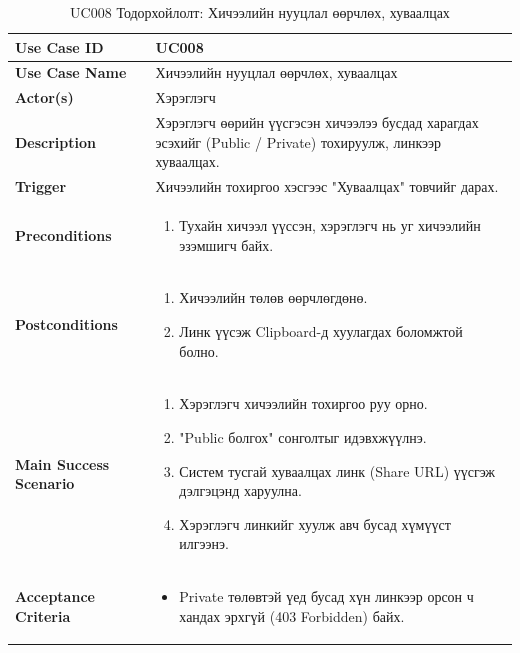 \begin{longtable}{|p{4cm}|p{11cm}|}
\caption{UC008 Тодорхойлолт: Хичээлийн нууцлал өөрчлөх, хуваалцах} \\
\hline
\textbf{Use Case ID} & UC008 \\ \hline
\textbf{Use Case Name} & Хичээлийн нууцлал өөрчлөх, хуваалцах \\ \hline
\textbf{Actor(s)} & Хэрэглэгч \\ \hline
\textbf{Description} & Хэрэглэгч өөрийн үүсгэсэн хичээлээ бусдад харагдах эсэхийг (Public / Private) тохируулж, линкээр хуваалцах. \\ \hline
\textbf{Trigger} & Хичээлийн тохиргоо хэсгээс "Хуваалцах" товчийг дарах. \\ \hline
\textbf{Preconditions} & 
\begin{enumerate}
    \item Тухайн хичээл үүссэн, хэрэглэгч нь уг хичээлийн эзэмшигч байх.
\end{enumerate} \\ \hline
\textbf{Postconditions} & 
\begin{enumerate}
    \item Хичээлийн төлөв өөрчлөгдөнө.
    \item Линк үүсэж Clipboard-д хуулагдах боломжтой болно.
\end{enumerate} \\ \hline
\textbf{Main Success Scenario} & 
\begin{enumerate}
    \item Хэрэглэгч хичээлийн тохиргоо руу орно.
    \item "Public болгох" сонголтыг идэвхжүүлнэ.
    \item Систем тусгай хуваалцах линк (Share URL) үүсгэж дэлгэцэнд харуулна.
    \item Хэрэглэгч линкийг хуулж авч бусад хүмүүст илгээнэ.
\end{enumerate} \\ \hline
\textbf{Acceptance Criteria} & 
\begin{itemize}
    \item Private төлөвтэй үед бусад хүн линкээр орсон ч хандах эрхгүй (403 Forbidden) байх.
\end{itemize} \\ \hline
\end{longtable}

